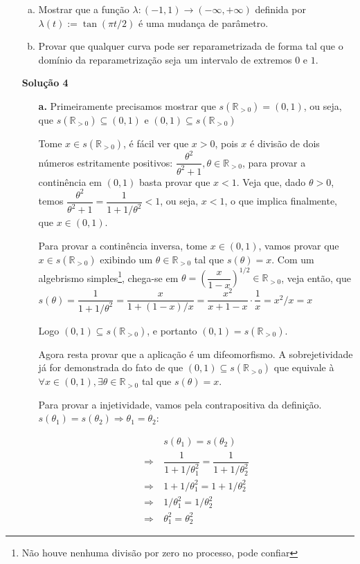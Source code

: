 \documentclass[12pt,letterpaper]{article}
\newcommand{\rpos}{\mathbb{R}_{>0}}
\newcommand{\sol}[1]{\textbf{Solução #1}}
\begin{document}
\begin{enumerate}
\begin{enumerate}[a.]
			
			
			\item Mostrar que a função $\lambda:(-1,1)\to(-\infty,+\infty)$ definida por $\lambda(t):=\tan(\pi t/2)$ é uma mudança de parâmetro.
			
			\item Provar que qualquer curva pode ser reparametrizada de forma tal que o domínio da reparametrização seja um intervalo de extremos $0$ e $1$.
		\end{enumerate}
	
	\item [\sol{4}] 
	\begin{enumerate}
		\item [\textbf{a.}]Primeiramente precisamos mostrar que $s(\rpos)=(0,1)$, ou seja, que $s(\rpos)\subseteq (0,1)$ e $(0,1)\subseteq s(\rpos)$
		
		Tome $x\in s(\rpos)$, é fácil ver que $x>0$, pois $x$ é divisão de dois números estritamente positivos: $\dfrac{\theta^2}{\theta^2+1},\theta\in\rpos$, para provar a continência em $(0,1)$ basta provar que $x<1$. Veja que, dado $\theta>0$, temos $\dfrac{\theta^2}{\theta^2+1}=\dfrac{1}{1+1/\theta^2}<1$, ou seja, $x<1$, o que implica finalmente, que $x\in(0,1)$.
		
		Para provar a continência inversa, tome $x\in(0,1)$, vamos provar que $x\in s(\rpos)$ exibindo um $\theta\in\rpos$ tal que $s(\theta)=x$. Com um algebrismo simples\footnote{Não houve nenhuma divisão por zero no processo, pode confiar}, chega-se em $\theta=\left(\dfrac{x}{1-x}\right)^{1/2}\in\rpos$, veja então, que $s(\theta)=\dfrac{1}{1+1/\theta^2}=\dfrac{x}{1+(1-x)/x}=\dfrac{x^2}{x+1-x}\cdot\dfrac1x=x^2/x=x$
		
		Logo $(0,1)\subseteq s(\rpos)$, e portanto $(0,1)= s(\rpos)$.
		
		Agora resta provar que a aplicação é um difeomorfismo. A sobrejetividade já for demonstrada do fato de que $(0,1)\subseteq s(\rpos)$ que equivale à $\forall x\in(0,1),\exists \theta\in\rpos$ tal que $s(\theta)=x$.
		
		Para provar a injetividade, vamos pela contrapositiva da definição. $s(\theta_1)=s(\theta_2)\Rightarrow\theta_1=\theta_2$:
		
		\begin{align*}
			&~s(\theta_1)=s(\theta_2)\\
			\Rightarrow&~\dfrac{1}{1+1/\theta_1^2}=\dfrac{1}{1+1/\theta_2^2}\\
			\Rightarrow&~1+1/\theta_1^2=1+1/\theta_2^2\\
			\Rightarrow&~1/\theta_1^2=1/\theta_2^2\\
			\Rightarrow&~\theta_1^2=\theta_2^2
		\end{align*}
	

\end{enumerate}
\end{enumerate}
\end{document}
